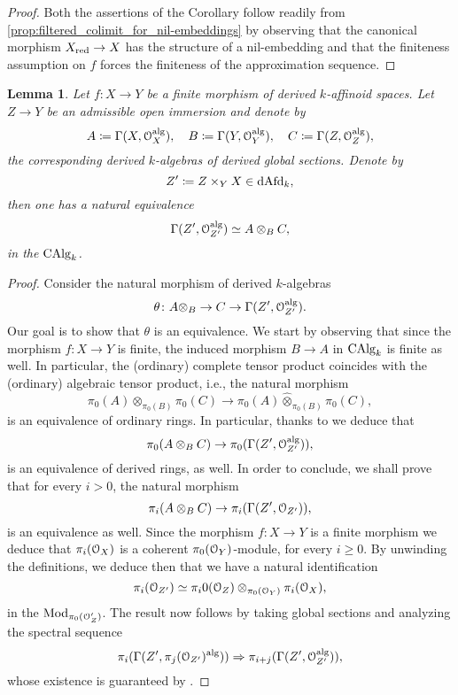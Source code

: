 \documentclass[10pt,a4paper,reqno]{amsart} %
\theoremstyle{plain}
\newtheorem{lem}[thm]{Lemma}
\theoremstyle{definition}
\theoremstyle{remark}
\numberwithin{equation}{section}
\begin{document}
\begin{proof}
    Both the assertions of the Corollary follow readily from \cref{prop:filtered_colimit_for_nil-embeddings} by observing that the
    canonical morphism $X_{\mathrm{red}} \to X$ has the structure of a nil-embedding and that the finiteness assumption on $f$ forces the finiteness of the approximation
    sequence.
\end{proof}

\begin{lem} \label{lem:pullbacks_of_derived_affinoid_spaces_along_finite_morphisms_are_algebraic}
    Let $f \colon X \to Y$ be a finite morphism of derived $k$-affinoid spaces. Let $Z \to Y$ be an admissible open immersion and denote by
        \[
            A \coloneqq \Gamma(X, \mathcal O_X^\mathrm{alg}), \quad B \coloneqq \Gamma(Y, \mathcal O_Y^\mathrm{alg}), \quad C \coloneqq \Gamma(Z, \mathcal O_Z^\mathrm{alg}),  
        \]
    the corresponding derived $k$-algebras of derived global sections. Denote by
        \[
            Z' \coloneqq Z \times_Y X \in \mathrm{dAfd}_k,   
        \]
    then one has a natural equivalence
        \[
            \Gamma(Z', \mathcal O_{Z'}^\mathrm{alg}) \simeq A \otimes_B C,  
        \]
    in the \infcat $\mathrm{CAlg}_k$.
\end{lem}

\begin{proof}
    Consider the natural morphism of derived $k$-algebras
        \[
            \theta \colon A \otimes_B \to C \to \Gamma(Z', \mathcal O_{Z'} ^\mathrm{alg}).
        \]
    Our goal is to show that $\theta$ is an equivalence. We start by observing that
    since the morphism $f \colon X \to Y$ is finite,
    the induced morphism $B \to A$ in $\mathrm{CAlg}_k$ is finite as well. In particular, the (ordinary) complete tensor product coincides with the (ordinary) algebraic tensor product, i.e.,
    the natural morphism
        \[
            \pi_0(A) \otimes_{\pi_0(B)} \pi_0(C) 
            \to \pi_0(A) \widehat{\otimes}_{\pi_0(B)} \pi_0(C)   ,
        \]
    is an equivalence of ordinary rings. In particular, thanks to \cite[Proposition 6.2 (v) and Theorem 6.5]{Porta_Yu_Derived_non-archimedean_analytic_spaces} we deduce that
        \[
            \pi_0(A \otimes_B C) \to \pi_0(\Gamma(Z', \mathcal O_{Z'}^\mathrm{alg})),  
        \]
    is an equivalence of derived rings, as well. In order to conclude, we shall prove that for every $i> 0$, the natural morphism
        \[
            \pi_i(A \otimes_B C) \to \pi_i(\Gamma(Z', \mathcal O_{Z'})),   
        \]
    is an equivalence as well. Since the morphism $f \colon X \to Y$ is a finite morphism we deduce that
    $\pi_i(\mathcal O_X)$ is a coherent $\pi_0(\mathcal O_Y)$-module, for every $i \ge 0$. By unwinding the definitions, we deduce then that we have a natural identification
        \[
            \pi_i(\mathcal O_{Z'}) \simeq \pi_i0(\mathcal O_Z) \otimes_{\pi_0(\mathcal O_Y)} \pi_i(\mathcal O_X),  
        \]
    in the \infcat $\mathrm{Mod}_{\pi_0(\mathcal O_Z')}$. The result now follows by taking global sections and analyzing the spectral sequence
        \[
            \pi_i(\Gamma(Z', \pi_j(\mathcal O_{Z'})^\mathrm{alg})) \Rightarrow \pi_{i+j}(\Gamma(Z', \mathcal O_{Z'}^\mathrm{alg})), 
        \]
    whose existence is guaranteed by \cite[1.2.2.14]{Lurie_Higher_algebra}.
\end{proof}
\end{document}

